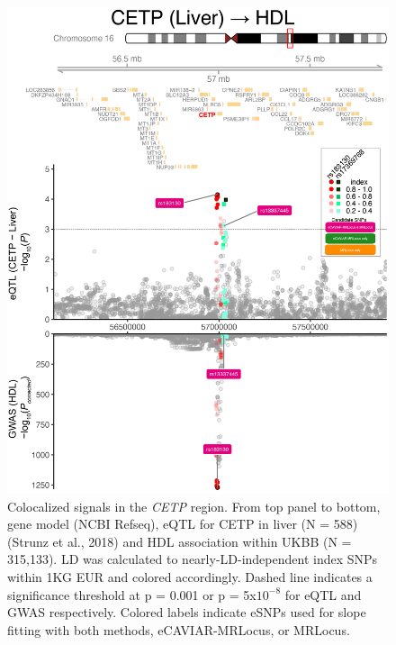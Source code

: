 \documentclass[11pt]{article}
\begin{document}
\begin{figure}[!ht]
  \centering
  \includegraphics[width=.7\textwidth]{figs/region/regionplot.CETP_Liver_HDL_UKBB.20210114.edit.png}
  \caption{Colocalized signals in the \emph{CETP} region. From top
    panel to bottom, gene model (NCBI Refseq), eQTL for CETP in liver
    (N = 588) (Strunz et al., 2018) and HDL association within UKBB (N
    = 315,133). LD was calculated to nearly-LD-independent index SNPs
    within 1KG EUR and colored accordingly. Dashed line indicates a
    significance threshold at p = 0.001 or p = 5x$10^{-8}$ for eQTL
    and GWAS respectively.
    Colored labels indicate eSNPs used for slope fitting with both
    methods, eCAVIAR-MRLocus, or MRLocus.}
\end{figure}
\end{document}

